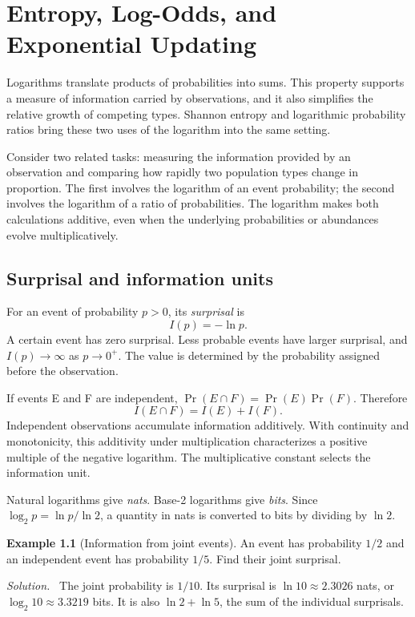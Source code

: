 \documentclass[11pt,oneside,openany]{book}
\theoremstyle{definition}
\newtheorem{example}{Example}[chapter]
\theoremstyle{remark}
\newenvironment{solution}{\par\smallskip\noindent\textit{Solution.}\ }{\par\smallskip}
\numberwithin{equation}{chapter}
\begin{document}
\mainmatter
\setcounter{chapter}{4}
\chapter{Entropy, Log-Odds, and Exponential Updating}
\label{ch:entropy}

Logarithms translate products of probabilities into sums. This property supports a measure of information carried by observations, and it also simplifies the relative growth of competing types. Shannon entropy and logarithmic probability ratios bring these two uses of the logarithm into the same setting.

Consider two related tasks: measuring the information provided by an observation and comparing how rapidly two population types change in proportion. The first involves the logarithm of an event probability; the second involves the logarithm of a ratio of probabilities. The logarithm makes both calculations additive, even when the underlying probabilities or abundances evolve multiplicatively.

\section{Surprisal and information units}
For an event of probability $p>0$, its \emph{surprisal} is
\begin{equation}\label{eq:surprisal}
I(p)=-\ln p.
\end{equation}
A certain event has zero surprisal. Less probable events have larger surprisal, and $I(p)\to\infty$ as $p\to0^+$. The value is determined by the probability assigned before the observation.

If events E and F are independent, $\Pr(E\cap F)=\Pr(E)\Pr(F)$. Therefore
\[
I(E\cap F)=I(E)+I(F).
\]
Independent observations accumulate information additively. With continuity and monotonicity, this additivity under multiplication characterizes a positive multiple of the negative logarithm. The multiplicative constant selects the information unit.

Natural logarithms give \emph{nats}. Base-2 logarithms give \emph{bits}. Since $\log_2p=\ln p/\ln2$, a quantity in nats is converted to bits by dividing by $\ln2$.

\begin{example}[Information from joint events]
An event has probability $1/2$ and an independent event has probability $1/5$. Find their joint surprisal.
\begin{solution}
The joint probability is $1/10$. Its surprisal is $\ln10\approx2.3026$ nats, or $\log_2 10\approx3.3219$ bits. It is also $\ln2+\ln5$, the sum of the individual surprisals.
\end{solution}
\end{example}
\end{document}
